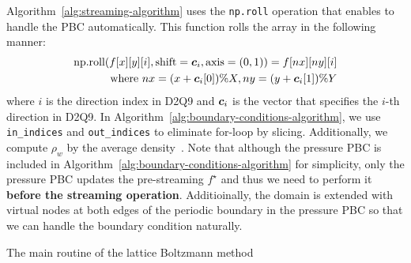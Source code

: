 Algorithm~\ref{alg:streaming-algorithm} uses
the {\tt np.roll} operation that enables
to handle the PBC automatically.
This function rolls the array in the following manner:
\begin{equation}
\begin{aligned}
  \text{np.roll}(f[x][y][i], \text{shift}=\boldsymbol{c}_i, \text{axis}=(0, 1)) =
  f[nx][ny][i] \\
  \text{where }
  nx = (x + \boldsymbol{c}_i[0]) \% X,
  ny = (y + \boldsymbol{c}_i[1]) \% Y
\end{aligned}
\end{equation}
where $i$ is the direction index in D2Q9 and $\boldsymbol{c}_i$ is the vector
that specifies the $i$-th direction in D2Q9.
In Algorithm~\ref{alg:boundary-conditions-algorithm},
we use {\tt in\_indices} and {\tt out\_indices}
to eliminate for-loop by slicing.
Additionally, we compute $\rho_w$ by the average density~\cite{khajepor2019study}.
Note that 
although the pressure PBC is included in Algorithm~\ref{alg:boundary-conditions-algorithm}
for simplicity,
only the pressure PBC updates the pre-streaming $f^\star$
and thus we need to perform it {\bf before the streaming operation}.
Additioinally, the domain is extended with virtual nodes 
at both edges of the periodic boundary in the pressure PBC
so that we can handle the boundary condition naturally. 


\begin{algorithm}[tb]
  \caption{The main routine of the lattice Boltzmann method}
  \label{alg:lattice-boltzmann-method-algorithm}
  \begin{algorithmic}[1]
     
    \State{$\rho(\xv, 0) = \rho_0, \uv(\xv, 0) = \uv_0$ for all $\xv \in [0, X) \times [0, Y)$}
    \EndFor
    \EndFunction
  \end{algorithmic}
\end{algorithm}

